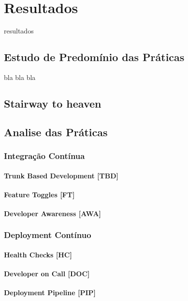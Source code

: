 
\chapter{Resultados}

resultados

\section{Estudo de Predomínio das Práticas}

bla bla bla
\section{Stairway to heaven}

\section{Analise das Práticas}

\subsection{Integração Contínua}
\subsubsection{Trunk Based Development [TBD]}

\subsubsection{Feature Toggles [FT]}
\subsubsection{Developer Awareness [AWA]}

\subsection{Deployment Contínuo}
\subsubsection{Health Checks [HC]}
\subsubsection{Developer on Call [DOC]}
\subsubsection{Deployment Pipeline [PIP]}

